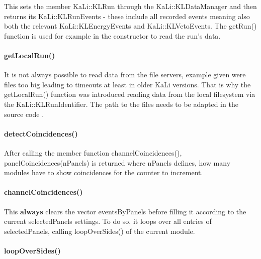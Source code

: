     This sets the member KaLi::KLRun through the KaLi::KLDataManager and then returns its KaLi::KLRunEvents - these include all recorded events meaning also both the relevant KaLi::KLEnergyEvents and KaLi::KLVetoEvents. The getRun() function is used for example in the constructor to read the run's data.
    
    \paragraph{getLocalRun()}
    \label{ch:Analysis software:sec:methods of the class run:subsec:getLocalRun()}
    
    It is not always possible to read data from the file servers, example given were files too big leading to timeouts at least in older KaLi versions. That is why the getLocalRun() function was introduced reading data from the local filesystem via the KaLi::KLRunIdentifier. The path to the files needs to be adapted in the source code .
    
    \paragraph{detectCoincidences()}
    \label{ch:Analysis software:sec:methods of the class run:subsec:detectCoincidences()}
    
    After calling the member function channelCoincidences(), panelCoincidences(nPanels) is returned where nPanels defines, how many modules have to show coincidences for the counter to increment. 
    
    \paragraph{channelCoincidences()}
    \label{ch:Analysis software:sec:methods of the class run:subsec:channelCoincidences()}
    This {\bf always} clears the vector eventsByPanels before filling it according to the current selectedPanels settings. To do so, it loops over all entries of selectedPanels, calling loopOverSides() of the current module.
    
    \paragraph{loopOverSides()}
    \label{ch:Analysis software:sec:methods of the class run:subsec:loopOverSides()}
    
